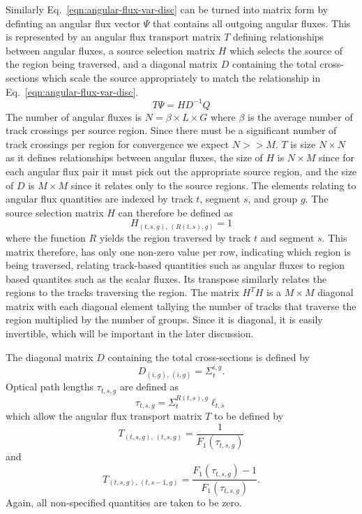 Similarly Eq.~\ref{eqn:angular-flux-var-disc} can be turned into matrix form by definting an angular flux vector $\Psi$ that contains all outgoing angular fluxes. This is represented by an angular flux transport matrix $T$ defining relationships between angular fluxes, a source selection matrix $H$ which selects the source of the region being traversed, and a diagonal matrix $D$ containing the total cross-sections which scale the source appropriately to match the relationship in Eq.~\ref{eqn:angular-flux-var-disc}.
\begin{equation}
T \Psi = H D^{-1} Q
\label{eqn:matrix-attn}
\end{equation}
The number of angular fluxes is $N = \beta \times L \times G$ where $\beta$ is the average number of track crossings per source region. Since there must be a significant number of track crossings per region for convergence we expect $N >> M$. $T$ is size $N \times N$ as it defines relationships between angular fluxes, the size of $H$ is $N \times M$ since for each angular flux pair it must pick out the appropriate source region, and the size of $D$ is $M \times M$ since it relates only to the source regions. The elements relating to angular flux quantities are indexed by track $t$, segment $s$, and group $g$. The source selection matrix $H$ can therefore be defined as
\begin{equation}
H_{\left(t,s,g\right), \, \left(R(t,s), g\right)} = 1
\end{equation}
where the function $R$ yields the region traversed by track $t$ and segment $s$. This matrix therefore, has only one non-zero value per row, indicating which region is being traversed, relating track-based quantities such as angular fluxes to region based quantites such as the scalar fluxes. Its transpose similarly relates the regions to the tracks traversing the region. The matrix $H^T H$ is a $M \times M$ diagonal matrix with each diagonal element tallying the number of tracks that traverse the region multiplied by the number of groups. Since it is diagonal, it is easily invertible, which will be important in the later discussion.

The diagonal matrix $D$ containing the total cross-sections is defined by
\begin{equation}
D_{\left(i, g\right), \, \left(i, g\right)} = \Sigma_t^{i,g}.
\end{equation}
Optical path lengths $\tau_{t,s,g}$ are defined as
\begin{equation}
\tau_{t,s,g} = \Sigma_{t}^{R(t,s),g} \ell_{t,s}
\end{equation}
which allow the angular flux transport matrix $T$ to be defined by
\begin{equation}
T_{\left(t,s,g\right), \, \left(t, s, g\right)} = \frac{1}{F_1(\tau_{t,s,g})}
\end{equation}
and
\begin{equation}
T_{\left(t,s,g\right), \, \left(t, s-1, g\right)} = \frac{F_1(\tau_{t,s,g}) - 1}{F_1(\tau_{t,s,g})}.
\end{equation}
Again, all non-specified quantities are taken to be zero.

